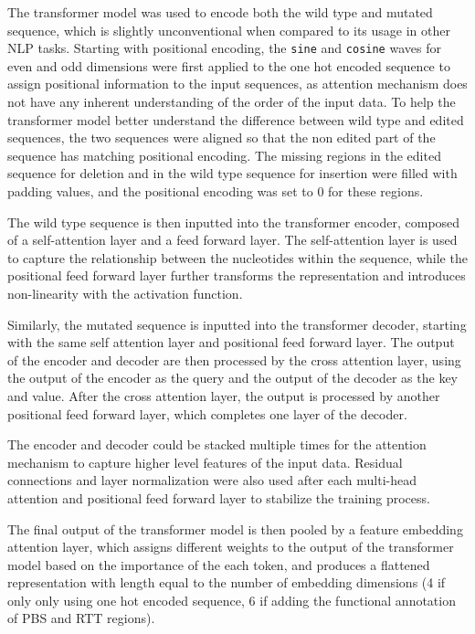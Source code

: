 The transformer model was used to encode both the wild type and mutated sequence, which is slightly unconventional when compared to its usage in other NLP tasks. Starting with positional encoding, the \verb|sine| and \verb|cosine| waves for even and odd dimensions were first applied to the one hot encoded sequence to assign positional information to the input sequences, as attention mechanism does not have any inherent understanding of the order of the input data. 
To help the transformer model better understand the difference between wild type and edited sequences, the two sequences were aligned so that the non edited part of the sequence has matching positional encoding. The missing regions in the edited sequence for deletion and in the wild type sequence for insertion were filled with padding values, and the positional encoding was set to 0 for these regions.

The wild type sequence is then inputted into the transformer encoder, composed of a self-attention layer and a feed forward layer. The self-attention layer is used to capture the relationship between the nucleotides within the sequence, while the positional feed forward layer further transforms the representation and introduces non-linearity with the activation function. 

Similarly, the mutated sequence is inputted into the transformer decoder, starting with the same self attention layer and positional feed forward layer. The output of the encoder and decoder are then processed by the cross attention layer, using the output of the encoder as the query and the output of the decoder as the key and value. After the cross attention layer, the output is processed by another positional feed forward layer, which completes one layer of the decoder. 

The encoder and decoder could be stacked multiple times for the attention mechanism to capture higher level features of the input data. Residual connections and layer normalization were also used after each multi-head attention and positional feed forward layer to stabilize the training process.

The final output of the transformer model is then pooled by a feature embedding attention layer, which assigns different weights to the output of the transformer model based on the importance of the each token, and produces a flattened representation with length equal to the number of embedding dimensions (4 if only only using one hot encoded sequence, 6 if adding the functional annotation of PBS and RTT regions).

